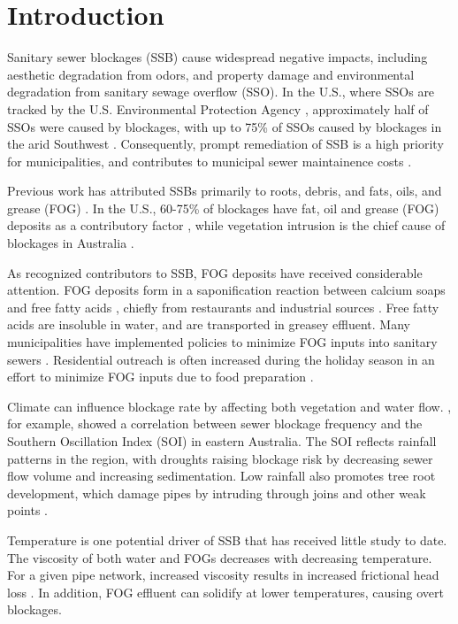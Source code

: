 \documentclass[letterpaper,12pt]{article}
\begin{document}
\section{Introduction}
Sanitary sewer blockages (SSB) cause widespread negative impacts, including
aesthetic degradation from odors, and property damage and environmental
degradation from sanitary sewage overflow (SSO).  In the U.S., where SSOs are
tracked by the U.S. Environmental Protection Agency \cite{epa2004local},
approximately half of SSOs were caused by blockages, with up to 75\% of SSOs
caused by blockages in the arid Southwest \cite{epa2004report}.
Consequently, prompt remediation of SSB is a high priority for municipalities,
and contributes to municipal sewer maintainence costs
\cite{maintainence-cost}.

Previous work has attributed SSBs primarily to roots, debris, and fats, oils,
and grease (FOG) \cite{epa2004report}.  In the U.S., 60-75\% of blockages
have fat, oil and grease (FOG) deposits as a contributory factor
\cite{Keener2008}, while vegetation intrusion is the chief cause of
blockages in Australia \cite{Marlow2011}.

As recognized contributors to SSB, FOG deposits have received considerable
attention. FOG deposits form in a saponification reaction between calcium soaps
and free fatty acids \cite{He2011}, chiefly from restaurants and
industrial sources \cite{Keener2008}.  Free fatty acids are insoluble in
water, and are transported in greasey effluent.  Many municipalities have
implemented policies to minimize FOG inputs into sanitary sewers
\cite{hassey2001grease, heckler2003best, parnell2005innovative,
bennett2006atlanta, tupper2008fog}.  Residential outreach is often increased
during the holiday season in an effort to minimize FOG inputs due to food
preparation \cite{tupper2008fog}.

Climate can influence blockage rate by affecting both vegetation and water
flow. \cite{Marlow2011}, for example, showed a correlation between sewer
blockage frequency and the Southern Oscillation Index (SOI) in eastern
Australia. The SOI reflects rainfall patterns in the region, with droughts
raising blockage risk by decreasing sewer flow volume and increasing
sedimentation. Low rainfall also promotes tree root development, which damage
pipes by intruding through joins and other weak points \cite{Desilva2011}.

Temperature is one potential driver of SSB that has received little study to
date. The viscosity of both water and FOGs decreases with decreasing
temperature. For a given pipe network, increased viscosity results in increased
frictional head loss \cite{romeo2002improved}. In addition, FOG effluent
can solidify at lower temperatures, causing overt blockages.
\end{document}
